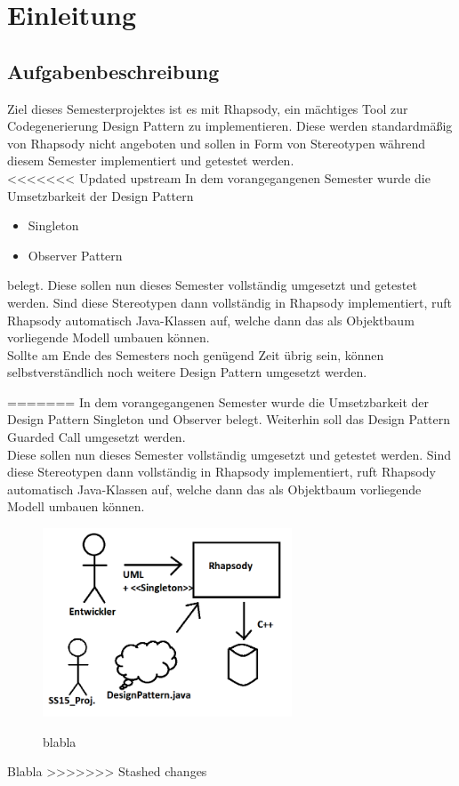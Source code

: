 \chapter{Einleitung}

\section{Aufgabenbeschreibung}

Ziel dieses Semesterprojektes ist es mit Rhapsody, ein mächtiges Tool zur Codegenerierung Design Pattern zu implementieren. Diese werden standardmäßig von Rhapsody nicht angeboten und sollen in Form von Stereotypen während diesem Semester implementiert und getestet werden.
\\
<<<<<<< Updated upstream
In dem vorangegangenen Semester wurde die Umsetzbarkeit der Design Pattern
\begin{itemize}
\item Singleton
\item Observer Pattern
\end{itemize}
belegt. Diese sollen nun dieses Semester vollständig umgesetzt und getestet werden. 
Sind diese Stereotypen dann vollständig in Rhapsody implementiert, ruft Rhapsody 
automatisch Java-Klassen auf, welche dann das als Objektbaum vorliegende Modell 
umbauen können.
\\
Sollte am Ende des Semesters noch genügend Zeit übrig sein, können
selbstverständlich noch weitere Design Pattern umgesetzt werden.

=======
In dem vorangegangenen Semester wurde die Umsetzbarkeit der Design Pattern Singleton und Observer belegt. Weiterhin soll das Design Pattern Guarded Call umgesetzt werden. \\
Diese sollen nun dieses Semester vollständig umgesetzt und getestet werden. Sind diese Stereotypen dann vollständig in Rhapsody implementiert, ruft Rhapsody automatisch Java-Klassen auf, welche dann das als Objektbaum vorliegende Modell umbauen können.

\begin{figure}[p]
	\centering
	\includegraphics[width=0.66\textwidth]{content/pictures/Simplification}
	\label{pic:bild}
	\caption{blabla}
\end{figure}

Blabla
>>>>>>> Stashed changes

